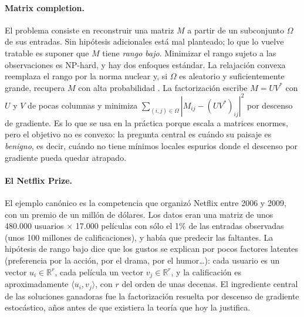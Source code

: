 \documentclass[11pt,a4paper]{article}
\begin{document}
\paragraph{Matrix completion.} El problema consiste en reconstruir una matriz $M$ a partir de un subconjunto $\Omega$ de sus entradas. Sin hipótesis adicionales está mal planteado; lo que lo vuelve tratable es suponer que $M$ tiene \emph{rango bajo}. Minimizar el rango sujeto a las observaciones es NP-hard, y hay dos enfoques estándar. La relajación convexa reemplaza el rango por la norma nuclear y, si $\Omega$ es aleatorio y suficientemente grande, recupera $M$ con alta probabilidad \cite{candes-recht}. La factorización escribe $M=UV^*$ con $U$ y $V$ de pocas columnas y minimiza $\sum_{(i,j)\in\Omega}|M_{ij}-(UV^*)_{ij}|^2$ por descenso de gradiente. Es lo que se usa en la práctica porque escala a matrices enormes, pero el objetivo no es convexo: la pregunta central es cuándo su paisaje es \emph{benigno}, es decir, cuándo no tiene mínimos locales espurios donde el descenso por gradiente pueda quedar atrapado.

\paragraph{El Netflix Prize.} El ejemplo canónico es la competencia que organizó Netflix entre 2006 y 2009, con un premio de un millón de dólares. Los datos eran una matriz de unos 480.000 usuarios $\times$ 17.000 películas con sólo el 1\% de las entradas observadas (unos 100 millones de calificaciones), y había que predecir las faltantes. La hipótesis de rango bajo dice que los gustos se explican por pocos factores latentes (preferencia por la acción, por el drama, por el humor\dots): cada usuario es un vector $u_i\in\mathbb{R}^r$, cada película un vector $v_j\in\mathbb{R}^r$, y la calificación es aproximadamente $\langle u_i,v_j\rangle$, con $r$ del orden de unas decenas. El ingrediente central de las soluciones ganadoras fue la factorización resuelta por descenso de gradiente estocástico, años antes de que existiera la teoría que hoy la justifica.
\end{document}
